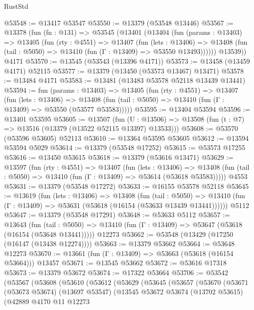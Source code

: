 \begin{lexlean}{RustStd}
\begin{coremodule}
@53548 := @13417 @53547
@53550 := @13379 (@53548 @13446)
@53567 := @13378
    (fun (fn : @131) =>
    @53545
      (@13401
        (@13404
          (fun (params : @13403) =>
          @13405
            (fun (rty : @4551) =>
            @13407
              (fun (lets : @13406) =>
              @13408 (fun (tail : @5050) => @13410 (fun (Γ : @13409) => @53550 @13493))))))
        @13539))
    @4171
@53570 := @13545 (@53543 (@13396 @4171))
@53573 := @13458 (@13459 @4171) @52115
@53577 := @13379 (@13450 (@53573 @13467) @13471)
@53578 := @13484 @4171
@53583 := @13481 (@13483 @53578 @52118 @13439 @13441)
@53594 := fun (params : @13403) =>
  @13405
    (fun (rty : @4551) =>
    @13407
      (fun (lets : @13406) =>
      @13408 (fun (tail : @5050) => @13410 (fun (Γ : @13409) => @53550 (@53577 @53583)))))
@53595 := @13404 @53594
@53596 := @13401 @53595
@53605 := @13507
    (fun (U : @13506) => @13508 (fun (t : @7) => @13516 (@13379 (@13522 @52115 @13397) @13533)))
@53608 := @53570 (@53596 @53605) @52113
@53610 := @13364 @53595 @53605
@53612 := @13594 @53594 @5029
@53614 := @13379 (@53548 @17252)
@53615 := @53573 @17255
@53616 := @13450 @53615
@53618 := @13379 (@53616 @13471)
@53629 := @13597
    (fun (rty : @4551) =>
    @13407
      (fun (lets : @13406) =>
      @13408 (fun (tail : @5050) => @13410 (fun (Γ : @13409) => @53614 (@53618 @53583)))))
    @4553
@53631 := @13379 (@53548 @17272)
@53633 := @16155 @53578 @52118
@53645 := @13619
    (fun (lets : @13406) =>
    @13408
      (fun (tail : @5050) =>
      @13410 (fun (Γ : @13409) => @53631 (@53618 (@16154 (@53633 @13439 @13441))))))
    @5112
@53647 := @13379 (@53548 @17291)
@53648 := @53633 @5112
@53657 := @13643
    (fun (tail : @5050) => @13410 (fun (Γ : @13409) => @53647 (@53618 (@16154 (@53648 @13441)))))
    @12273
@53662 := @53548 (@13429 (@17250 (@16147 (@13438 @12274))))
@53663 := @13379 @53662
@53664 := @53648 @12273
@53670 := @13661 (fun (Γ : @13409) => @53663 (@53618 (@16154 @53664))) @13457
@53671 := @13545 @53662
@53672 := @53616 @17318
@53673 := @13379 @53672
@53674 := @17322 @53664
@53706 := @53542
    (@53567
      (@53608
        (@53610
          (@53612
            (@53629
              (@53645
                (@53657
                  (@53670
                    (@53671
                      (@53673 @53674)
                      (@13697 @53547)
                      (@13545
                        @53672
                        @53674
                        (@13702 @53615)
                        (@42889
                          @4170
                          @11
                          @12273

\end{coremodule}
\end{lexlean}
